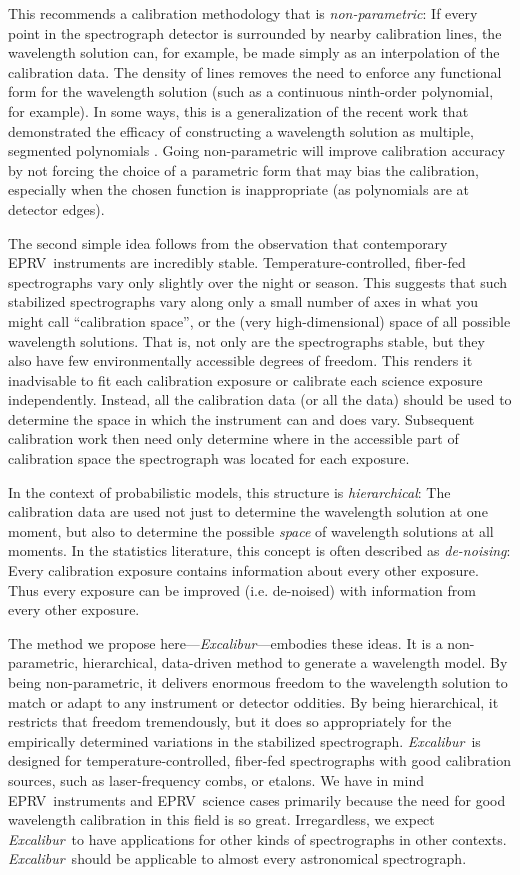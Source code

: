 \documentclass[modern]{aastex63}
\newcommand{\project}[1]{\textsl{#1}}
\newcommand{\name}{\project{Excalibur}}
\newcommand{\acronym}[1]{{\small{#1}}}
\newcommand{\eprv}{\acronym{EPRV}}
\begin{document}
This recommends a calibration methodology that is \emph{non-parametric}:  If every point in the spectrograph detector is surrounded by nearby calibration lines, the wavelength solution can, for example, be made simply as an interpolation of the calibration data.  The density of lines removes the need to enforce any functional form for the wavelength solution (such as a continuous ninth-order polynomial, for example).  In some ways, this is a generalization of the recent work that demonstrated the efficacy of constructing a wavelength solution as multiple, segmented polynomials \citep{milakovic2020}.  Going non-parametric will improve calibration accuracy by not forcing the choice of a parametric form that may bias the calibration, especially when the chosen function is inappropriate (as polynomials are at detector edges).

The second simple idea follows from the observation that contemporary \eprv\ instruments are incredibly stable.  Temperature-controlled, fiber-fed spectrographs vary only slightly over the night or season.  This suggests that such stabilized spectrographs vary along only a small number of axes in what you might call ``calibration space'', or the (very high-dimensional) space of all possible wavelength solutions.  That is, not only are the spectrographs stable, but they also have few environmentally accessible degrees of freedom.  This renders it inadvisable to fit each calibration exposure or calibrate each science exposure independently.  Instead, all the calibration data (or all the data) should be used to determine the space in which the instrument can and does vary.  Subsequent calibration work then need only determine where in the accessible part of calibration space the spectrograph was located for each exposure.

In the context of probabilistic models, this structure is \emph{hierarchical}:  The calibration data are used not just to determine the wavelength solution at one moment, but also to determine the possible \emph{space} of wavelength solutions at all moments.  In the statistics literature, this concept is often described as \emph{de-noising}:  Every calibration exposure contains information about every other exposure.  Thus every exposure can be improved (i.e. de-noised) with information from every other exposure.

The method we propose here---\name---embodies these ideas.
It is a non-parametric, hierarchical, data-driven method to generate a wavelength model.  By being non-parametric, it delivers enormous freedom to the wavelength solution to match or adapt to any instrument or detector oddities.  By being hierarchical, it restricts that freedom tremendously, but it does so appropriately for the empirically determined variations in the stabilized spectrograph.  \name\ is designed for temperature-controlled, fiber-fed spectrographs with good calibration sources, such as laser-frequency combs, or etalons.  We have in mind \eprv\ instruments and \eprv\ science cases primarily because the need for good wavelength calibration in this field is so great.  Irregardless, we expect \name\ to have applications for other kinds of spectrographs in other contexts.  \name\ should be applicable to almost every astronomical spectrograph.
\end{document}
